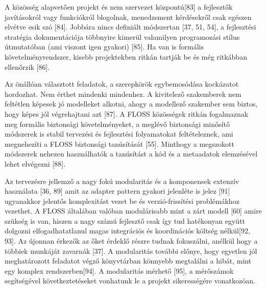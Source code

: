 \documentclass[12pt,magyar,a4paper,oneside]{scrreprt}
\begin{document}
A közösség alapvetően projekt és nem szervezet központú{[}83{]} a
fejlesztők javításokról vagy funkciókról blogolnak, menedzsment
kérdésekről csak egészen elvétve esik szó {[}84{]}. Jobbára nincs
definiált módszertan {[}37, 51, 54{]}, a fejlesztési stratégia
dokumentációja többnyire kimerül valamilyen programozási stílus
útmutatóban (ami viszont igen gyakori) {[}85{]}. Ha van is formális
követelményrendszer, kisebb projektekben ritkán tartják be és még
ritkábban ellenőrzik {[}86{]}.

Az önállóan választott feladatok, a szerepkörök egybemosódása kockázatot
hordozhat. Nem érthet mindenki mindenhez. A kivitelező szakemberek nem
feltétlen képesek jó modelleket alkotni, ahogy a modellező szakember sem
biztos, hogy képes jól végrehajtani azt {[}87{]}. A FLOSS közösségek
ritkán fogalmaznak meg formális biztonsági követelményeket, a meglévő
biztonsági minősítő módszerek is stabil tervezési és fejlesztési
folyamatokat feltételeznek, ami megnehezíti a FLOSS biztonsági
tanúsítását {[}55{]}. Minthogy a megszokott módszerek nehezen
használhatók a tanúsítást a kód és a metaadatok elemzésével lehet
elvégezni {[}88{]}.

Az tervezésre jellemző a nagy fokú modularitás és a komponensek extenzív
használata {[}36, 89{]} amit az adapter pattern gyakori jelenléte is
jelez {[}91{]} ugyanakkor jelentős komplexitást vezet be és
verzió-frissítési problémákhoz vezethet. A FLOSS általában valóban
modulárisabb mint a zárt modell {[}60{]} amire szükség is van, hiszen a
nagy számú fejlesztő csak így tud hatékonyan együtt dolgozni
elfogadhatatlanul magas integrációs és koordinációs költség nélkül{[}92,
93{]}. Az újonnan érkezők az őket érdeklő részre tudnak fokuszálni,
anélkül hogy a többiek munkáját zavarnák {[}37{]}. A modularitás további
előnye, hogy egyetlen jól meghatározott feladatot végző könyvtárban
könnyebb megtalálni a hibát, mint egy komplex rendszerben{[}94{]}. A
modularitás mérhető {[}95{]}, a mérőszámok segítségével
következtetéseket vonhatunk le a projekt sikerességére vonatkozóan.
\end{document}
